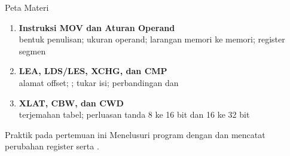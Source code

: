 \documentclass[aspectratio=169,11pt]{beamer}
\begin{document}
\begin{frame}{Peta Materi}
\small
\begin{enumerate}
    \item \textbf{Instruksi MOV dan Aturan Operand}\\
          {\footnotesize bentuk penulisan; ukuran operand;
          larangan memori ke memori; register segmen}

    \vspace{0.25em}
    \item \textbf{LEA, LDS/LES, XCHG, dan CMP}\\
          {\footnotesize alamat offset; ; tukar
          isi; perbandingan dan }

    \vspace{0.25em}
    \item \textbf{XLAT, CBW, dan CWD}\\
          {\footnotesize terjemahan tabel; perluasan tanda 8 ke 16
          bit dan 16 ke 32 bit}
\end{enumerate}

\vspace{0.35em}
\begin{block}{Praktik pada pertemuan ini}
\small Menelusuri program  dengan
 dan mencatat perubahan register serta .
\end{block}
\end{frame}

\end{document}
